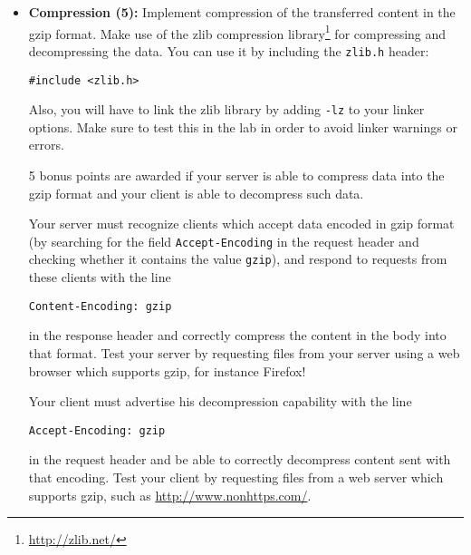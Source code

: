 \begin{itemize}
\item \textbf{Compression (5):}
Implement compression of the transferred content in the gzip format.
Make use of the zlib compression library\footnote{\url{http://zlib.net/}}
for compressing and decompressing the data.
You can use it by including the \texttt{zlib.h} header:

\verb|#include <zlib.h>|

Also, you will have to link the zlib library by adding \texttt{-lz} to your linker options.
Make sure to test this in the lab in order to avoid linker warnings or errors.

5 bonus points are awarded if your server is able to compress data
into the gzip format and your client is able to decompress such data.

Your server must recognize clients which accept data encoded in gzip format
(by searching for the field \verb|Accept-Encoding| in the request header
and checking whether it contains the value \verb|gzip|),
and respond to requests from these clients with the line

\verb|Content-Encoding: gzip|

in the response header
and correctly compress the content in the body into that format.
Test your server by requesting files from your server
using a web browser which supports gzip, for instance Firefox!

Your client must advertise his decompression capability with the line

\verb|Accept-Encoding: gzip|

in the request header and be able to correctly decompress content sent with that encoding.
Test your client by requesting files from a web server which supports gzip,
such as \url{http://www.nonhttps.com/}.

\end{itemize}




\osueguidelinesthree


